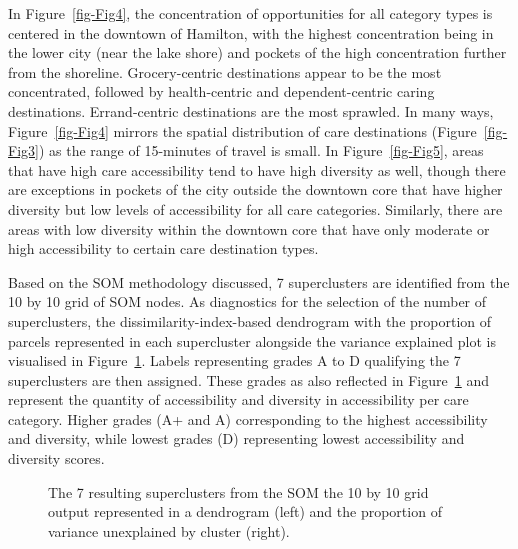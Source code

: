 \documentclass[
  authoryear,
  preprint,
  3p]{elsarticle}
\begin{document}
In Figure~\ref{fig-Fig4}, the concentration of opportunities for all
category types is centered in the downtown of Hamilton, with the highest
concentration being in the lower city (near the lake shore) and pockets
of the high concentration further from the shoreline. Grocery-centric
destinations appear to be the most concentrated, followed by
health-centric and dependent-centric caring destinations. Errand-centric
destinations are the most sprawled. In many ways, Figure~\ref{fig-Fig4}
mirrors the spatial distribution of care destinations
(Figure~\ref{fig-Fig3}) as the range of 15-minutes of travel is small.
In Figure~\ref{fig-Fig5}, areas that have high care accessibility tend
to have high diversity as well, though there are exceptions in pockets
of the city outside the downtown core that have higher diversity but low
levels of accessibility for all care categories. Similarly, there are
areas with low diversity within the downtown core that have only
moderate or high accessibility to certain care destination types.

Based on the SOM methodology discussed, 7 superclusters are identified
from the 10 by 10 grid of SOM nodes. As diagnostics for the selection of
the number of superclusters, the dissimilarity-index-based dendrogram
with the proportion of parcels represented in each supercluster
alongside the variance explained plot is visualised in
Figure~\ref{fig-Fig6}. Labels representing grades A to D qualifying the
7 superclusters are then assigned. These grades as also reflected in
Figure~\ref{fig-Fig6} and represent the quantity of accessibility and
diversity in accessibility per care category. Higher grades (A+ and A)
corresponding to the highest accessibility and diversity, while lowest
grades (D) representing lowest accessibility and diversity scores.

\begin{figure}


\caption{\label{fig-Fig6}The 7 resulting superclusters from the SOM the
10 by 10 grid output represented in a dendrogram (left) and the
proportion of variance unexplained by cluster (right).}

\end{figure}%
\end{document}
